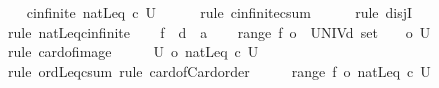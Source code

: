 \begin{isabellebody}
\isanewline
\ \ \isamarkupfalse%
\ {\isachardoublequoteopen}cinfinite\ {\isacharparenleft}{\kern0pt}natLeq\ {\isacharplus}{\kern0pt}c\ {\isacharquery}{\kern0pt}U{\isacharparenright}{\kern0pt}{\isachardoublequoteclose}\isanewline
\ \ \ \ \isamarkupfalse%
\ {\isacharparenleft}{\kern0pt}rule\ cinfinite{\isacharunderscore}{\kern0pt}csum{\isacharparenright}{\kern0pt}\isanewline
\ \ \ \ \isamarkupfalse%
\ {\isacharparenleft}{\kern0pt}rule\ disjI{}{\isacharparenright}{\kern0pt}\isanewline
\ \ \ \ \isamarkupfalse%
\ {\isacharparenleft}{\kern0pt}rule\ natLeq{\isacharunderscore}{\kern0pt}cinfinite{\isacharparenright}{\kern0pt}\isanewline
{}\isamarkupfalse%
\isanewline
\ \ \isamarkupfalse%
\ f\ {\isacharcolon}{\kern0pt}{\isacharcolon}{\kern0pt}\ {\isachardoublequoteopen}{\isacharprime}{\kern0pt}d\ {\isacharequal}{\kern0pt}{\isachargreater}{\kern0pt}\ {\isacharprime}{\kern0pt}a{\isachardoublequoteclose}\isanewline
\ \ \isamarkupfalse%
\ {\isachardoublequoteopen}{\isacharbar}{\kern0pt}range\ f{\isacharbar}{\kern0pt}\ {\isasymle}o\ {\isacharbar}{\kern0pt}\ {\isacharparenleft}{\kern0pt}UNIV{\isacharcolon}{\kern0pt}{\isacharcolon}{\kern0pt}{\isacharprime}{\kern0pt}d\ set{\isacharparenright}{\kern0pt}\ {\isacharbar}{\kern0pt}{\isachardoublequoteclose}\ {\isacharparenleft}{\kern0pt}\ {\isachardoublequoteopen}{\isacharunderscore}{\kern0pt}\ {\isasymle}o\ {\isacharquery}{\kern0pt}U{\isachardoublequoteclose}{\isacharparenright}{\kern0pt}\ \isamarkupfalse%
\ {\isacharparenleft}{\kern0pt}rule\ card{\isacharunderscore}{\kern0pt}of{\isacharunderscore}{\kern0pt}image{\isacharparenright}{\kern0pt}\isanewline
\ \ \isamarkupfalse%
\ \isamarkupfalse%
\ {\isachardoublequoteopen}{\isacharquery}{\kern0pt}U\ {\isasymle}o\ natLeq\ {\isacharplus}{\kern0pt}c\ {\isacharquery}{\kern0pt}U{\isachardoublequoteclose}\ \isamarkupfalse%
\ {\isacharparenleft}{\kern0pt}rule\ ordLeq{\isacharunderscore}{\kern0pt}csum{}{\isacharparenright}{\kern0pt}\ {\isacharparenleft}{\kern0pt}rule\ card{\isacharunderscore}{\kern0pt}of{\isacharunderscore}{\kern0pt}Card{\isacharunderscore}{\kern0pt}order{\isacharparenright}{\kern0pt}\isanewline
\ \ \isamarkupfalse%
\ \isamarkupfalse%
\ {\isachardoublequoteopen}{\isacharbar}{\kern0pt}range\ f{\isacharbar}{\kern0pt}\ {\isasymle}o\ natLeq\ {\isacharplus}{\kern0pt}c\ {\isacharquery}{\kern0pt}U{\isachardoublequoteclose}\ \isacommand{{\isachardot}{\kern0pt}}\isamarkupfalse%

\end{isabellebody}
